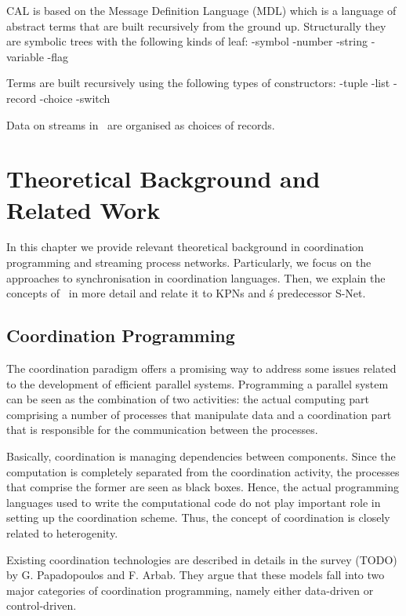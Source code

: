 CAL is based on the Message Definition Language (MDL) which is a language of abstract terms that are built recursively from the ground up. Structurally they are symbolic trees with the following kinds of leaf:
-symbol
-number
-string
-variable
-flag

Terms are built recursively using the following types of constructors:
-tuple
-list
-record
-choice
-switch


Data on streams in \ak\ are organised as choices of records.



\chapter{Theoretical Background and Related Work}
In this chapter we provide relevant theoretical background in coordination programming and streaming process networks. Particularly, we focus on the approaches to synchronisation in coordination languages. Then, we explain the concepts of \ak\ in more detail and relate it to KPNs and \ak\'s predecessor S-Net.



    \section{Coordination Programming}
The coordination paradigm offers a promising way to address some issues related to the development of efficient parallel systems. Programming a parallel system can be seen as the combination of two activities: the actual computing part comprising a number of processes that manipulate data and a coordination part that is responsible for the communication between the processes.

Basically, coordination is managing dependencies between components. Since the computation is completely separated from the coordination activity, the processes that comprise the former are seen as black boxes. Hence, the actual programming languages used to write the computational code do not play important role in setting up the coordination scheme. Thus, the concept of coordination is closely related to heterogenity.

Existing coordination technologies are described in details in the survey (TODO) by G. Papadopoulos and F. Arbab. They argue that these models fall into two major categories of coordination programming, namely either data-driven or control-driven.

